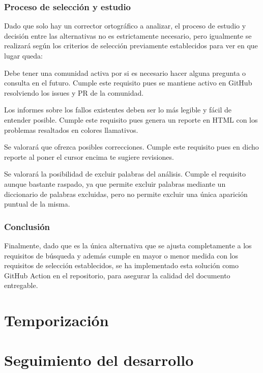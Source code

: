 \subsubsection{Proceso de selección y estudio}
Dado que solo hay un corrector ortográfico a analizar, el proceso de estudio y
decisión entre las alternativas no es estrictamente necesario, pero igualmente
se realizará según los criterios de selección previamente establecidos para ver
en que lugar queda: 

\begin{todolist}
    \item[\xcmark] Debe tener una comunidad activa por si es necesario hacer
    alguna pregunta o consulta en el futuro. Cumple este requisito pues se
    mantiene activo en GitHub resolviendo los issues y PR de la comunidad.
    \item[\xcmark] Los informes sobre los fallos existentes deben ser lo más
    legible y fácil de entender posible. Cumple este requisito pues genera un
    reporte en HTML con los problemas resaltados en colores llamativos.
    \item[\xcmark] Se valorará que ofrezca posibles correcciones. Cumple este
    requisito pues en dicho reporte al poner el cursor encima te sugiere
    revisiones.
    \item[\xcmark] Se valorará la posibilidad de excluir palabras del análisis.
    Cumple el requisito aunque bastante raspado, ya que permite excluir palabras
    mediante un diccionario de palabras excluidas, pero no permite excluir una
    única aparición puntual de la misma.
\end{todolist}

\subsubsection{Conclusión}
Finalmente, dado que es la única alternativa que se ajusta completamente a los
requisitos de búsqueda y además cumple en mayor o menor medida con los
requisitos de selección establecidos, se ha implementado esta solución como
GitHub Action en el repositorio, para asegurar la calidad del documento
entregable.

\section{Temporización}

\section{Seguimiento del desarrollo}
